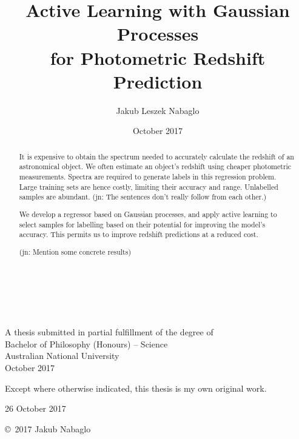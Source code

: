 \documentclass[11pt,twoside,openright]{report}
\title{Active Learning with Gaussian Processes\\for Photometric Redshift Prediction}
\author{Jakub Leszek Nabaglo}
\date{October 2017}
\newcommand\jn[1]{{\color{red}(jn: #1)}}
\begin{document}
\begin{titlepage}
  \enlargethispage{2cm}
  \begin{center}
    \makeatletter
    \hspace{0pt} \\[3cm]
    \huge\@title \\[.4cm]

    \LARGE\@author \\[8.5cm]
    \makeatother
    \Large A thesis submitted in partial fulfillment of the degree of \\
    \LARGE Bachelor of Philosophy (Honours) -- Science\\[3cm]

    \LARGE Australian National University \\[1cm]
    October 2017
  \end{center}
\end{titlepage}

\vspace*{5cm}
\begin{center}
  Except where otherwise indicated, this thesis is my own original
  work.
\end{center}

\vspace*{2cm}

\hspace{8cm}\makeatletter\@author\makeatother\par
\hspace{8cm}26 October 2017

\vspace*{12cm}

\begin{center}
  \copyright\ 2017 Jakub Nabaglo
\end{center}
\noindent

\begin{abstract}
  It is expensive to obtain the spectrum needed to accurately calculate the redshift of an astronomical object. We often estimate an object's redshift using cheaper photometric measurements. Spectra are required to generate labels in this regression problem. Large training sets are hence costly, limiting their accuracy and range. Unlabelled samples are abundant. \jn{The sentences don't really follow from each other.}

  We develop a regressor based on Gaussian processes, and apply active learning to select samples for labelling based on their potential for improving the model's accuracy. This permits us to improve redshift predictions at a reduced cost.

  \jn{Mention some concrete results}
\end{abstract}
\end{document}
